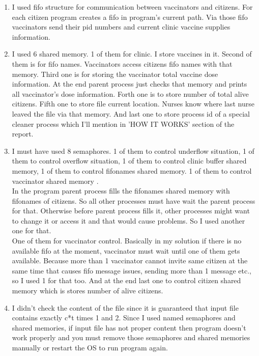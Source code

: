 \documentclass{article}
\begin{document}
\begin{enumerate}[label=\alph*.), leftmargin=1.5\parindent]
  \item I used fifo structure for communication between vaccinators and citizens. For each citizen  program creates a fifo in program's current path. Via those fifo vaccinators send their pid numbers and current clinic vaccine supplies information. 
  \item I used 6 shared memory. 1 of them for clinic. I store vaccines in it. Second of them is for fifo names. Vaccinators access citizens fifo names with that memory. Third one is for storing the vaccinator total vaccine dose information. At the end parent process just checks that memory and prints all vaccinator's dose information. Forth one is to store number of total alive citizens. Fifth one to store file current location. Nurses know where last nurse leaved the file via that memory. And last one to store process id of a special cleaner process which I'll mention in 'HOW IT WORKS' section of the report. 
  \item I must have used 8 semaphores. 1 of them to control underflow situation, 1 of them to control overflow situation, 1 of them to control clinic buffer shared memory, 1 of them to control fifonames shared memory. 1 of them to control vaccinator shared memory . 
  \\
  In the program parent process fills the fifonames shared memory with fifonames of citizens. So all other processes must have wait the parent process for that. Otherwise before parent process fills it, other processes might want to change it or access it and that would cause problems. So I used another one for that. 
  \\
  One of them for vaccinator control. Basically in my solution if there is no available fifo at the moment, vaccinator must wait until one of them gets available. Because more than 1 vaccinator cannot invite same citizen  at the same time that causes fifo message issues, sending more than 1 message etc., so I used 1 for that too. And at the end last one to control citizen shared memory which is stores number of alive citizens.
  \item I didn't check the content of the file since it is guaranteed that input file contains exactly c*t times 1 and 2. Since I used named semaphores and shared memories, if input file has not proper content then program doesn't work properly and you must remove those semaphores and shared memories manually or restart the OS to run program again.
  
\end{enumerate}
\end{document}
